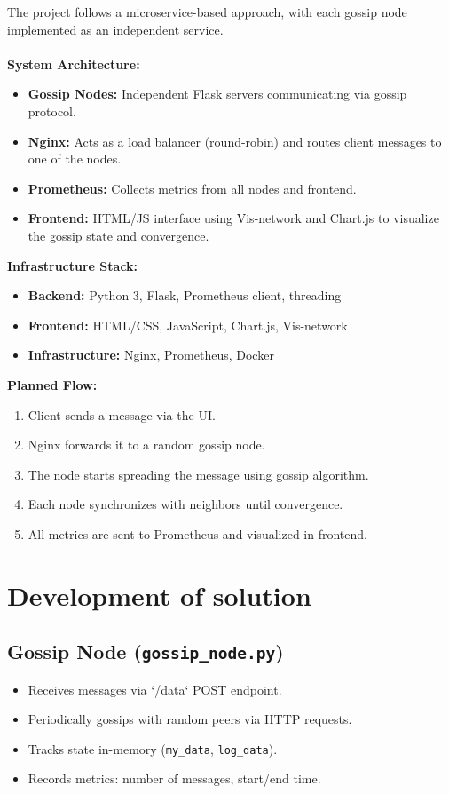 \documentclass[a4paper,12pt]{article}
\begin{document}
The project follows a microservice-based approach, with each gossip node implemented as an independent service.\\\\
\textbf{System Architecture:}
\begin{itemize}
    \item \textbf{Gossip Nodes:} Independent Flask servers communicating via gossip protocol.
    \item \textbf{Nginx:} Acts as a load balancer (round-robin) and routes client messages to one of the nodes.
    \item \textbf{Prometheus:} Collects metrics from all nodes and frontend.
    \item \textbf{Frontend:} HTML/JS interface using Vis-network and Chart.js to visualize the gossip state and convergence.
\end{itemize}
\textbf{Infrastructure Stack:}
\begin{itemize}
    \item \textbf{Backend:} Python 3, Flask, Prometheus client, threading
    \item \textbf{Frontend:} HTML/CSS, JavaScript, Chart.js, Vis-network
    \item \textbf{Infrastructure:} Nginx, Prometheus, Docker
\end{itemize}
\textbf{Planned Flow:}
\begin{enumerate}
    \item Client sends a message via the UI.
    \item Nginx forwards it to a random gossip node.
    \item The node starts spreading the message using gossip algorithm.
    \item Each node synchronizes with neighbors until convergence.
    \item All metrics are sent to Prometheus and visualized in frontend.
\end{enumerate}

\section{Development of solution}

\subsection*{Gossip Node (\texttt{gossip\_node.py})}
\begin{itemize}
    \item Receives messages via `/data` POST endpoint.
    \item Periodically gossips with random peers via HTTP requests.
    \item Tracks state in-memory (\verb|my_data|, \verb|log_data|).
    \item Records metrics: number of messages, start/end time.
\end{itemize}
\end{document}
